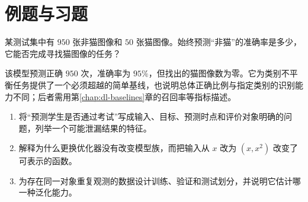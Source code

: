 \section{例题与习题}
\begin{example}[高准确率的简单基线]
某测试集中有 $950$ 张非猫图像和 $50$ 张猫图像。始终预测“非猫”的准确率是多少，它能否完成寻找猫图像的任务？
\end{example}
\begin{solve}
该模型预测正确 $950$ 次，准确率为 $95\%$，但找出的猫图像数为零。它为类别不平衡任务提供了一个必须超越的简单基线，也说明总体正确比例与指定类别的识别能力不同；后者需用第\ref{chap:dl-baselines}章的召回率等指标描述。
\end{solve}
\begin{enumerate}
\item 将“预测学生是否通过考试”写成输入、目标、预测时点和评价对象明确的问题，列举一个可能泄漏结果的特征。
\item 解释为什么更换优化器没有改变模型族，而把输入从 $x$ 改为 $(x,x^2)$ 改变了可表示的函数。
\item 为存在同一对象重复观测的数据设计训练、验证和测试划分，并说明它估计哪一种泛化能力。
\end{enumerate}

